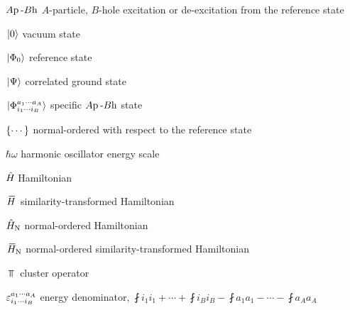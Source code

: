 \documentclass[thesis.tex]{subfiles}
\begin{document}
\begin{itemize}
\item[$A\mathrm{p}\hspace{2pt}\text{-}B\mathrm{h}$] $A$-particle, $B$-hole excitation or de-excitation from the reference state
\item[$\hspace{1pt}\lvert 0 \rangle$] vacuum state
\item[$\hspace{1pt}\lvert \Phi_{0} \rangle$] reference state
\item[$\hspace{1pt}\lvert \Psi \rangle$] correlated ground state
\item[$\hspace{1pt}\lvert \Phi^{a_{1}\cdots a_{A}}_{i_{1}\cdots i_{B}} \rangle$] specific $A\mathrm{p}\hspace{2pt}\text{-}B\mathrm{h}$ state
\item[$\left\{\cdots\right\}$] normal-ordered with respect to the reference state
\item[$\hbar\omega$] harmonic oscillator energy scale
\item[$\hat{H}\hspace{-1pt}$] Hamiltonian
\item[$\EHam$] similarity-transformed Hamiltonian
\item[$\hat{H}_{\mathrm{N}}$] normal-ordered Hamiltonian
\item[$\EHamN$] normal-ordered similarity-transformed Hamiltonian
\item[$\Top$] cluster operator
\item[$\varepsilon^{a_{1}\cdots a_{A}}_{i_{1}\cdots i_{B}}$] energy denominator, $\fint{i_{1}}{i_{1}} + \cdots + \fint{i_{B}}{i_{B}} - \fint{a_{1}}{a_{1}} - \cdots - \fint{a_{A}}{a_{A}}$
\end{itemize}
\end{document}
